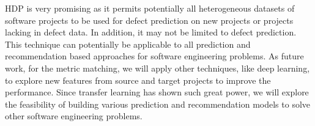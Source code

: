 
HDP is very promising as it permits potentially all heterogeneous datasets
of software projects to be used for defect prediction on new projects or
projects lacking in defect data.
In addition, it may not be limited to defect prediction. This technique can
potentially be applicable to all prediction and recommendation based approaches
for software engineering problems.
As future work, for the metric
matching, we will apply other techniques, like deep learning, to explore new features from source and target projects to improve the performance. Since transfer learning has shown such great power, we will explore the feasibility of building various prediction and recommendation models to solve other software engineering problems. 





